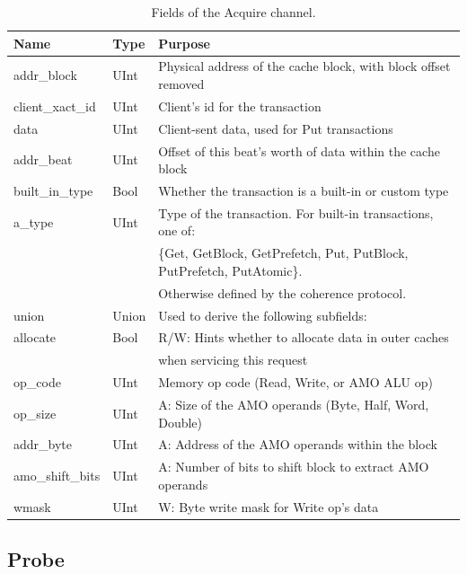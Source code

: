 \begin{table}[ht]
\begin{center}
\begin{tabular}{|l|l|l|}
    \hline
    Name & Type & Purpose \\ \hline \hline
addr\_block & UInt & Physical address of the cache block, with block offset removed \\ \hline
client\_xact\_id & UInt & Client's id for the transaction \\ \hline
data & UInt & Client-sent data, used for Put transactions \\ \hline
addr\_beat & UInt & Offset of this beat's worth of data within the cache block \\ \hline
built\_in\_type & Bool & Whether the transaction is a built-in or custom type \\ \hline
a\_type & UInt & Type of the transaction. For built-in transactions, one of: \\
        &      & \{Get, GetBlock, GetPrefetch, Put, PutBlock, PutPrefetch, PutAtomic\}. \\
        &      &  Otherwise defined by the coherence protocol. \\ \hline
union & Union & Used to derive the following subfields: \\ \hline \hline
allocate & Bool & R/W: Hints whether to allocate data in outer caches \\
         &      & when servicing this request \\ \hline
op\_code & UInt & Memory op code (Read, Write, or AMO ALU op) \\ \hline
op\_size & UInt & A: Size of the AMO operands (Byte, Half, Word, Double) \\ \hline
addr\_byte & UInt & A: Address of the AMO operands within the block \\ \hline
amo\_shift\_bits & UInt & A: Number of bits to shift block to extract AMO operands \\ \hline
wmask & UInt & W: Byte write mask for Write op's data \\ \hline
\end{tabular}
\end{center}
\caption{Fields of the Acquire channel.}
\label{tab:acquire}
\end{table}

\subsection{Probe}


